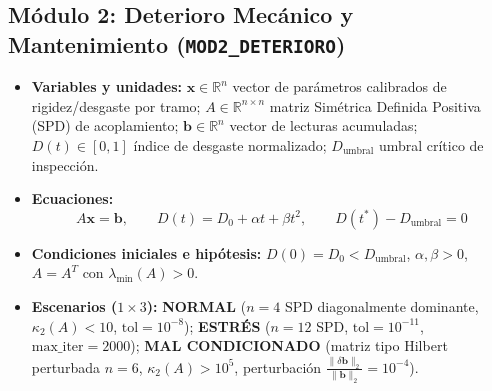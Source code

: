 \documentclass[11pt,a4paper]{article}
\begin{document}
\subsection{Módulo 2: Deterioro Mecánico y Mantenimiento (\texttt{MOD2\_DETERIORO})}
\begin{itemize}
    \item \textbf{Variables y unidades:} $\mathbf{x} \in \mathbb{R}^n$ vector de parámetros calibrados de rigidez/desgaste por tramo; $A \in \mathbb{R}^{n\times n}$ matriz Simétrica Definida Positiva (SPD) de acoplamiento; $\mathbf{b} \in \mathbb{R}^n$ vector de lecturas acumuladas; $D(t) \in [0,1]$ índice de desgaste normalizado; $D_{\text{umbral}}$ umbral crítico de inspección.
    \item \textbf{Ecuaciones:}
    \[
        A\mathbf{x} = \mathbf{b}, \qquad D(t) = D_0 + \alpha t + \beta t^2, \qquad D(t^*) - D_{\text{umbral}} = 0
    \]
    \item \textbf{Condiciones iniciales e hipótesis:} $D(0)=D_0 < D_{\text{umbral}}$, $\alpha,\beta > 0$, $A = A^T$ con $\lambda_{\min}(A) > 0$.
    \item \textbf{Escenarios ($1\times 3$):} \textbf{NORMAL} ($n=4$ SPD diagonalmente dominante, $\kappa_2(A)<10$, $\text{tol}=10^{-8}$); \textbf{ESTRÉS} ($n=12$ SPD, $\text{tol}=10^{-11}$, $\text{max\_iter}=2000$); \textbf{MAL CONDICIONADO} (matriz tipo Hilbert perturbada $n=6$, $\kappa_2(A)>10^5$, perturbación $\frac{\|\delta\mathbf{b}\|_2}{\|\mathbf{b}\|_2}=10^{-4}$).
\end{itemize}
\end{document}
